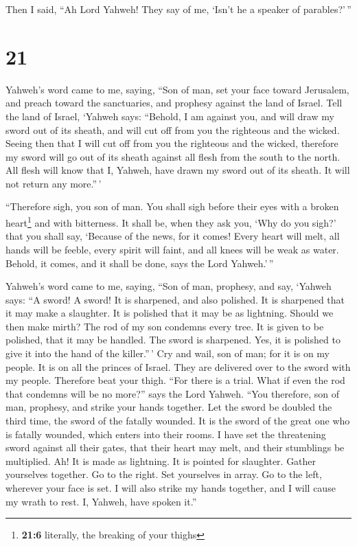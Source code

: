  Then I said, ``Ah Lord Yahweh! They say of me, `Isn't he
a speaker of parables?'\,''

\hypertarget{section-19}{%
\section{21}\label{section-19}}

 Yahweh's word came to me, saying,  ``Son of
man, set your face toward Jerusalem, and preach toward the sanctuaries,
and prophesy against the land of Israel.  Tell the land of
Israel, `Yahweh says: ``Behold, I am against you, and will draw my sword
out of its sheath, and will cut off from you the righteous and the
wicked.  Seeing then that I will cut off from you the
righteous and the wicked, therefore my sword will go out of its sheath
against all flesh from the south to the north.  All flesh
will know that I, Yahweh, have drawn my sword out of its sheath. It will
not return any more.''\,'

 ``Therefore sigh, you son of man. You shall sigh before
their eyes with a broken heart\footnote{\textbf{21:6} literally, the
  breaking of your thighs} and with bitterness.  It shall
be, when they ask you, `Why do you sigh?' that you shall say, `Because
of the news, for it comes! Every heart will melt, all hands will be
feeble, every spirit will faint, and all knees will be weak as water.
Behold, it comes, and it shall be done, says the Lord Yahweh.'\,''

 Yahweh's word came to me, saying,  ``Son of
man, prophesy, and say, `Yahweh says: ``A sword! A sword! It is
sharpened, and also polished.  It is sharpened that it
may make a slaughter. It is polished that it may be as lightning. Should
we then make mirth? The rod of my son condemns every tree.
 It is given to be polished, that it may be handled. The
sword is sharpened. Yes, it is polished to give it into the hand of the
killer.''\,'  Cry and wail, son of man; for it is on my
people. It is on all the princes of Israel. They are delivered over to
the sword with my people. Therefore beat your thigh. 
``For there is a trial. What if even the rod that condemns will be no
more?'' says the Lord Yahweh.  ``You therefore, son of
man, prophesy, and strike your hands together. Let the sword be doubled
the third time, the sword of the fatally wounded. It is the sword of the
great one who is fatally wounded, which enters into their rooms.
 I have set the threatening sword against all their
gates, that their heart may melt, and their stumblings be multiplied.
Ah! It is made as lightning. It is pointed for slaughter.
 Gather yourselves together. Go to the right. Set
yourselves in array. Go to the left, wherever your face is set.
 I will also strike my hands together, and I will cause
my wrath to rest. I, Yahweh, have spoken it.''

